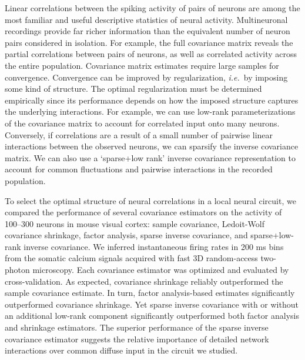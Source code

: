 Linear correlations between the spiking activity of pairs of neurons are among the most familiar and useful descriptive statistics of neural activity. Multineuronal recordings provide far richer information than the equivalent number of neuron pairs considered in isolation. For example, the full covariance matrix reveals the partial correlations between pairs of neurons, as well as correlated activity across the entire population. Covariance matrix estimates require large samples for convergence. Convergence  can be improved by regularization, \emph{i.e.}~by imposing some kind of structure.  The optimal regularization must be determined empirically since its performance depends on how the imposed structure captures the underlying interactions. For example, we can use low-rank parameterizations of the covariance matrix to account for correlated input onto many neurons. Conversely, if correlations are a result of a small number of  pairwise linear interactions between the observed neurons, we can sparsify the inverse covariance matrix. We can also use a `sparse+low rank’ inverse covariance representation to account for common fluctuations and pairwise interactions in the recorded population.  

To select the optimal structure of neural correlations in a local neural circuit, we compared the performance of several covariance estimators on the activity of 100--300 neurons in mouse visual cortex: sample covariance, Ledoit-Wolf covariance shrinkage, factor analysis, sparse inverse covariance, and sparse+low-rank inverse covariance. We inferred instantaneous firing rates in 200 ms bins from the somatic calcium signals acquired with fast 3D random-access two-photon microscopy.  Each covariance estimator was optimized and evaluated by cross-validation. As expected, covariance shrinkage reliably outperformed the sample covariance estimate. In turn, factor analysis-based estimates significantly outperformed covariance shrinkage. Yet sparse inverse covariance with or without an additional low-rank component significantly outperformed both factor analysis and shrinkage estimators. The superior performance of the sparse inverse covariance estimator suggests the relative importance of detailed network interactions over common diffuse input in the circuit we studied.
